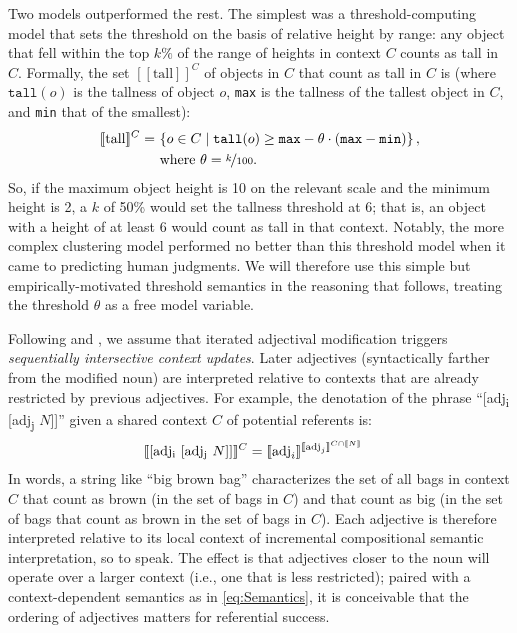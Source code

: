 \documentclass[10pt,a4paper]{article}
\newcommand{\den}[1]{\ensuremath{[\![#1]\!]}}
\begin{document}
Two models outperformed the rest. The simplest was a threshold-computing model that sets the threshold on the basis of relative height by range: any object that fell within the top $k\%$ of the range of heights in context $C$ counts as tall in $C$. Formally, the set $\den{\text{tall}}^C$ of objects in $C$ that count as tall in $C$ is (where $\texttt{tall}(o)$ is the tallness of object $o$, \texttt{max} is the tallness of the tallest object in $C$, and \texttt{min} that of the smallest):
\begin{align}
  \label{eq:Semantics}
  \den{\text{tall}}^C  = & \ \{ o \in C \mid \texttt{tall}(o) \ge \texttt{max} - \theta \cdot (\texttt{max} - \texttt{min}) \} \,, \\
  & \text{ where $\theta = \nicefrac{k}{100}$.} \nonumber
\end{align}
So, if the maximum object height is 10 on the relevant scale and the minimum height is 2, a $k$ of 50\% would set the tallness threshold at 6; that is, an object with a height of at least 6 would count as tall in that context. Notably, the more complex clustering model performed no better than this threshold model when it came to predicting human judgments. We will therefore use this simple but empirically-motivated threshold semantics in the reasoning that follows, treating the threshold $\theta$ as a free model variable.

Following  and , we assume that iterated adjectival modification triggers \emph{sequentially intersective context updates}. Later adjectives (syntactically farther from the modified noun) are interpreted relative to contexts that are already restricted by previous adjectives. For example, the denotation of the phrase ``[adj\textsubscript{i} [adj\textsubscript{j} $N$]]'' given a shared context $C$ of potential referents is:
\begin{align}
  \label{eq:SequentialInterpretation}
  \den{\text{[adj\textsubscript{i} [adj\textsubscript{j} $N$]]}}^{C} & = \den{\text{adj}_i}^{\den{\text{adj}_j}^{C\cap \den{N}}} 
\end{align} 
In words, a string like ``big brown bag'' characterizes the set of all bags in context $C$ that count as brown (in the set of bags in $C$) and that count as big (in the set of bags that count as brown in the set of bags in $C$). Each adjective is therefore interpreted relative to its local context of incremental compositional semantic interpretation, so to speak. The effect is that adjectives closer to the noun will operate over a larger context (i.e., one that is less restricted); paired with a context-dependent semantics as in \eqref{eq:Semantics}, it is conceivable that the ordering of adjectives matters for referential success.
\end{document}
